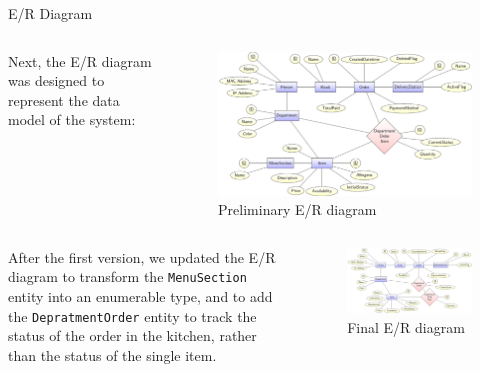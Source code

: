\begin{frame}[allowframebreaks]{E/R Diagram}

	\begin{columns}
		\begin{column}{0.4\textwidth}
			\justifying Next, the E/R diagram was designed to represent the data model of the
			system:
		\end{column}
		\begin{column}{0.6\textwidth}
			\begin{figure}[h!]
				\centering
				\includegraphics[width=\textwidth,height=0.6\textheight,keepaspectratio]{images/er v0}
				\caption{Preliminary E/R diagram}
				\label{fig:er_preliminary}
			\end{figure}
		\end{column}
	\end{columns}

	\framebreak

	\begin{columns}
		\begin{column}{0.4\textwidth}
			\justifying After the first version, we updated the E/R diagram to transform the \texttt{MenuSection} entity
			into an enumerable type, and to add the \texttt{DepratmentOrder} entity to track the status of the order in the
			kitchen, rather than the status of the single item.
		\end{column}
		\begin{column}{0.6\textwidth}
			\begin{figure}[h!]
				\centering
				\includegraphics[width=\textwidth,height=0.6\textheight,keepaspectratio]{images/er v1}
				\caption{Final E/R diagram}
				\label{fig:er_final}
			\end{figure}
		\end{column}
	\end{columns}


\end{frame}
